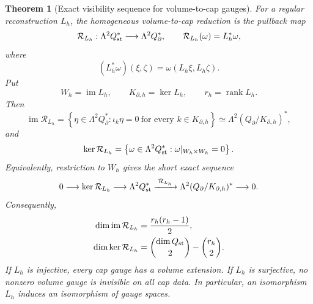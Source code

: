 \documentclass[11pt,a4paper]{article}
\newtheorem{theorem}{Theorem}[section]
\begin{document}
\begin{theorem}[Exact visibility sequence for volume-to-cap gauges]
\label{thm:volume-cap-reduction}
For a regular reconstruction \(L_h\), the homogeneous volume-to-cap reduction is
the pullback map
\begin{equation}\label{eq:volume-cap-pullback}
 \mathcal R_{L_h}:\Lambda^2Q_{\rm st}^*
 \longrightarrow\Lambda^2Q_\partial^*,
 \qquad
 \mathcal R_{L_h}(\omega)=L_h^*\omega,
\end{equation}
where
\[
 (L_h^*\omega)(\xi,\zeta)
 =\omega(L_h\xi,L_h\zeta).
\]
Put
\[
 W_h=\operatorname{im}L_h,\qquad
 K_{\partial,h}=\ker L_h,\qquad r_h=\operatorname{rank}L_h.
\]
Then
\begin{equation}\label{eq:volume-cap-image}
 \operatorname{im}\mathcal R_{L_h}
 =
 \left\{\eta\in\Lambda^2Q_\partial^*:
 \iota_k\eta=0\ \text{for every }k\in K_{\partial,h}\right\}
 \simeq\Lambda^2(Q_\partial/K_{\partial,h})^*,
\end{equation}
and
\begin{equation}\label{eq:volume-cap-kernel}
 \ker\mathcal R_{L_h}
 =
 \left\{\omega\in\Lambda^2Q_{\rm st}^*:
 \omega|_{W_h\times W_h}=0\right\}.
\end{equation}
Equivalently, restriction to \(W_h\) gives the short exact sequence
\begin{equation}\label{eq:volume-cap-exact-sequence}
 0\longrightarrow\ker\mathcal R_{L_h}
 \longrightarrow\Lambda^2Q_{\rm st}^*
 \xrightarrow{\;\mathcal R_{L_h}\;}
 \Lambda^2(Q_\partial/K_{\partial,h})^*
 \longrightarrow0.
\end{equation}
Consequently,
\begin{align}
 \dim\operatorname{im}\mathcal R_{L_h}
 &=\frac{r_h(r_h-1)}2,\label{eq:volume-cap-image-dimension}\\
 \dim\ker\mathcal R_{L_h}
 &=\binom{\dim Q_{\rm st}}2-\binom{r_h}2.
 \label{eq:volume-cap-kernel-dimension}
\end{align}
If \(L_h\) is injective, every cap gauge has a volume extension.  If
\(L_h\) is surjective, no nonzero volume gauge is invisible on all cap
data.  In particular, an isomorphism \(L_h\) induces an isomorphism of
gauge spaces.
\end{theorem}
\end{document}
